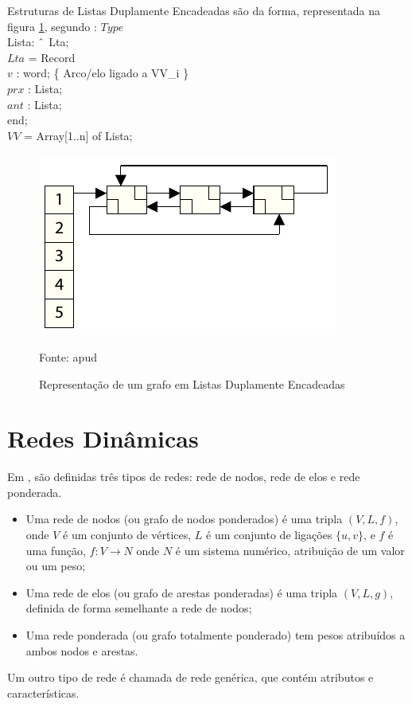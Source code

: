 Estruturas de Listas Duplamente Encadeadas são da forma, representada na figura \ref{fig:listdupla}, segundo \cite{negreirosbook}:
\FloatBarrier
\noindent $Type$\\
Lista: $\string^$ Lta;\\
$Lta$ = Record\\
$v$ : word; \{ Arco/elo ligado a VV\_i \}\\
$prx$ : Lista;\\
$ant$ : Lista;\\
end;\\
$VV$ = Array[1..n] of Lista;\\

\begin{figure}[htbp]
\centering
 \includegraphics[width=.45\textwidth]{chapters/fig/listdupla.png}
\caption{Representação de um grafo em Listas Duplamente Encadeadas}
Fonte: \cite{dynagraph} apud \cite{negreirosbook}
\label{fig:listdupla}
\end{figure}

\FloatBarrier

\section{Redes Dinâmicas}

Em \cite{harary}, são definidas três tipos de redes: rede de nodos, rede de elos e rede ponderada.
\begin{itemize}
\item Uma rede de nodos (ou grafo de nodos ponderados) é uma tripla $(V, L, f)$, onde $V$ é um conjunto
de vértices, $L$ é um conjunto de ligações $\{u,v\}$, e $f$ é uma função, $f: V \rightarrow N$ onde $N$
é um sistema numérico, atribuição de um valor ou um peso;
\item Uma rede de elos (ou grafo de arestas ponderadas) é uma tripla $(V, L, g)$, definida de forma semelhante a rede de nodos;
\item Uma rede ponderada (ou grafo totalmente ponderado) tem pesos atribuídos a ambos nodos e arestas.
\end{itemize}

Um outro tipo de rede é chamada de rede genérica, que contém atributos e características.

